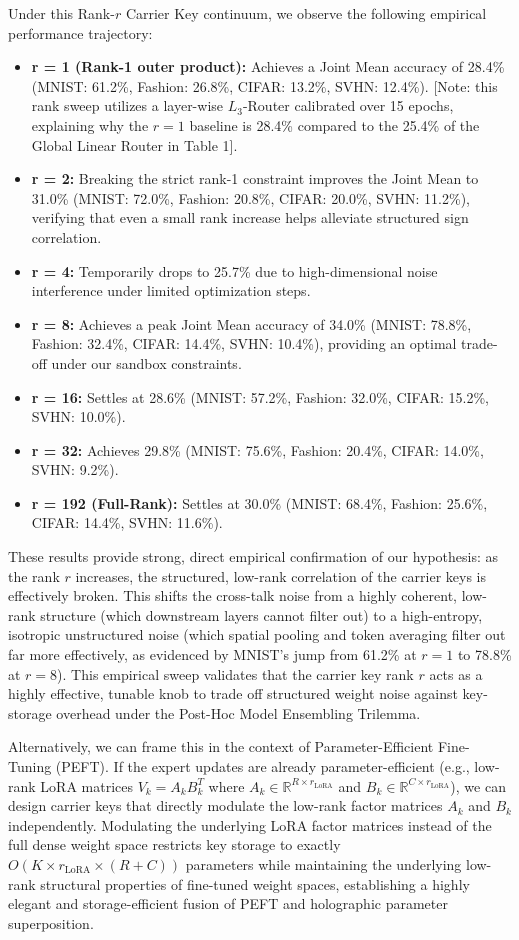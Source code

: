 Under this Rank-$r$ Carrier Key continuum, we observe the following empirical performance trajectory:
\begin{itemize}
\item \textbf{r = 1 (Rank-1 outer product):} Achieves a Joint Mean accuracy of 28.4\% (MNIST: 61.2\%, Fashion: 26.8\%, CIFAR: 13.2\%, SVHN: 12.4\%). [Note: this rank sweep utilizes a layer-wise $L_3$-Router calibrated over 15 epochs, explaining why the $r=1$ baseline is 28.4\% compared to the 25.4\% of the Global Linear Router in Table 1].
\item \textbf{r = 2:} Breaking the strict rank-1 constraint improves the Joint Mean to 31.0\% (MNIST: 72.0\%, Fashion: 20.8\%, CIFAR: 20.0\%, SVHN: 11.2\%), verifying that even a small rank increase helps alleviate structured sign correlation.
\item \textbf{r = 4:} Temporarily drops to 25.7\% due to high-dimensional noise interference under limited optimization steps.
\item \textbf{r = 8:} Achieves a peak Joint Mean accuracy of 34.0\% (MNIST: 78.8\%, Fashion: 32.4\%, CIFAR: 14.4\%, SVHN: 10.4\%), providing an optimal trade-off under our sandbox constraints.
\item \textbf{r = 16:} Settles at 28.6\% (MNIST: 57.2\%, Fashion: 32.0\%, CIFAR: 15.2\%, SVHN: 10.0\%).
\item \textbf{r = 32:} Achieves 29.8\% (MNIST: 75.6\%, Fashion: 20.4\%, CIFAR: 14.0\%, SVHN: 9.2\%).
\item \textbf{r = 192 (Full-Rank):} Settles at 30.0\% (MNIST: 68.4\%, Fashion: 25.6\%, CIFAR: 14.4\%, SVHN: 11.6\%).
\end{itemize}

These results provide strong, direct empirical confirmation of our hypothesis: as the rank $r$ increases, the structured, low-rank correlation of the carrier keys is effectively broken. This shifts the cross-talk noise from a highly coherent, low-rank structure (which downstream layers cannot filter out) to a high-entropy, isotropic unstructured noise (which spatial pooling and token averaging filter out far more effectively, as evidenced by MNIST's jump from 61.2\% at $r=1$ to 78.8\% at $r=8$). This empirical sweep validates that the carrier key rank $r$ acts as a highly effective, tunable knob to trade off structured weight noise against key-storage overhead under the Post-Hoc Model Ensembling Trilemma.

Alternatively, we can frame this in the context of Parameter-Efficient Fine-Tuning (PEFT). If the expert updates are already parameter-efficient (e.g., low-rank LoRA matrices $V_k = A_k B_k^T$ where $A_k \in \mathbb{R}^{R \times r_{\text{LoRA}}}$ and $B_k \in \mathbb{R}^{C \times r_{\text{LoRA}}}$), we can design carrier keys that directly modulate the low-rank factor matrices $A_k$ and $B_k$ independently. Modulating the underlying LoRA factor matrices instead of the full dense weight space restricts key storage to exactly $O(K \times r_{\text{LoRA}} \times (R+C))$ parameters while maintaining the underlying low-rank structural properties of fine-tuned weight spaces, establishing a highly elegant and storage-efficient fusion of PEFT and holographic parameter superposition.

